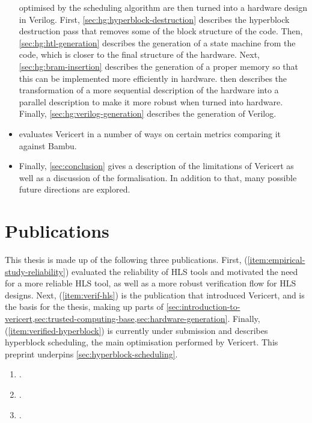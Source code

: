 \begin{itemize}
  optimised by the scheduling algorithm are then turned into a hardware design
  in Verilog.  First, \cref{sec:hg:hyperblock-destruction} describes the
  hyperblock destruction pass that removes some of the block structure of the
  code.  Then, \cref{sec:hg:htl-generation} describes the generation of a state
  machine from the code, which is closer to the final structure of the hardware.
  Next, \cref{sec:hg:bram-insertion} describes the generation of a proper memory
  so that this can be implemented more efficiently in hardware.
   then describes the transformation
  of a more sequential description of the hardware into a parallel description
  to make it more robust when turned into hardware.  Finally,
  \cref{sec:hg:verilog-generation} describes the generation of Verilog.
\item {} evaluates Vericert in a number of ways on certain
  metrics comparing it against Bambu.
\item Finally, \cref{sec:conclusion} gives a description of the limitations of
  Vericert as well as a discussion of the formalisation.  In addition to that,
  many possible future directions are explored.
\end{itemize}

\section{Publications}

This thesis is made up of the following three publications.  First,
(\ref{item:empirical-study-reliability}) evaluated the reliability of \gls{HLS}
tools and motivated the need for a more reliable \gls{HLS} tool, as well as a
more robust verification flow for \gls{HLS} designs.  Next,
(\ref{item:verif-hls}) is the publication that introduced Vericert, and is the
basis for the thesis, making up parts of
\cref{sec:introduction-to-vericert,sec:trusted-computing-base,sec:hardware-generation}.
Finally, (\ref{item:verified-hyperblock}) is currently under submission and
describes hyperblock scheduling, the main optimisation performed by Vericert.
This preprint underpins \cref{sec:hyperblock-scheduling}.

\begin{enumerate}
\item\label{item:empirical-study-reliability} .
\item\label{item:verif-hls} .
\item\label{item:verified-hyperblock} .
\end{enumerate}

